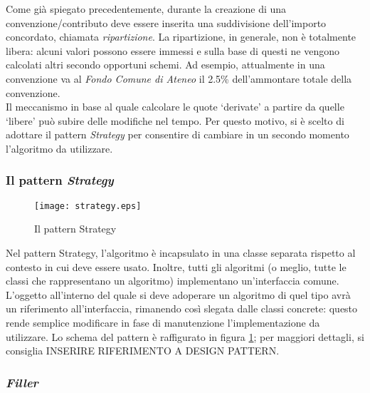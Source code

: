 Come già spiegato precedentemente, durante la creazione di una convenzione/contributo deve essere inserita una suddivisione dell'importo concordato, chiamata \textsl{ripartizione}. La ripartizione, in generale, non è totalmente libera: alcuni valori possono essere immessi e sulla base di questi ne vengono calcolati altri secondo opportuni schemi. Ad esempio, attualmente in una convenzione va al \textsl{Fondo Comune di Ateneo} il 2.5\% dell'ammontare totale della convenzione. \\
Il meccanismo in base al quale calcolare le quote \textquoteleft derivate\textquoteright{} a partire da quelle \textquoteleft libere\textquoteright{} può subire delle modifiche nel tempo. Per questo motivo, si è scelto di adottare il pattern \textsl{Strategy} per consentire di cambiare in un secondo momento l'algoritmo da utilizzare.\\

\subsubsection{Il pattern \textsl{Strategy}}

\begin{figure}
\centering
\texttt{[image: strategy.eps]}
\caption{Il pattern Strategy}
\label{strategy}
\end{figure}


Nel pattern Strategy, l'algoritmo è incapsulato in una classe separata rispetto al contesto in cui deve essere usato. Inoltre, tutti gli algoritmi (o meglio, tutte le classi che rappresentano un algoritmo) implementano un'interfaccia comune. L'oggetto all'interno del quale si deve adoperare un algoritmo di quel tipo avrà un riferimento all'interfaccia, rimanendo così slegata dalle classi concrete: questo rende semplice modificare in fase di manutenzione l'implementazione da utilizzare. Lo schema del pattern è raffigurato in figura \ref{strategy}; per maggiori dettagli, si consiglia INSERIRE RIFERIMENTO A DESIGN PATTERN.\\

\subsubsection{\textsl{Filler}}

